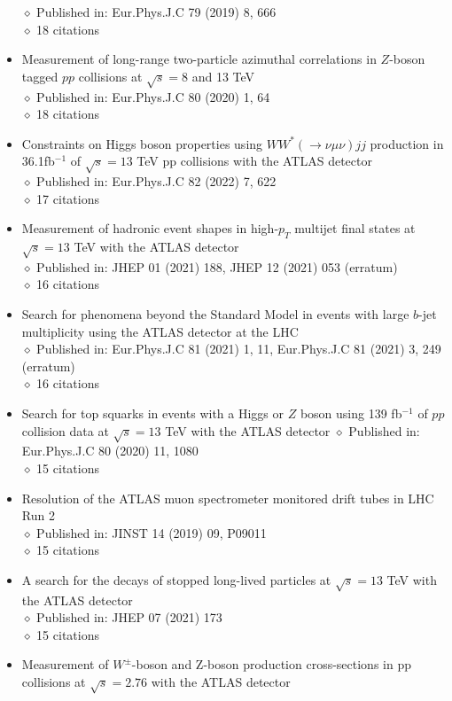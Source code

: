 \documentclass[margin, 10pt]{res} %
\begin{document}
\begin{resume}
\begin{itemize}
$\diamond$ Published in: Eur.Phys.J.C 79 (2019) 8, 666\\
$\diamond$ 18 citations
\item Measurement of long-range two-particle azimuthal correlations in $Z$-boson tagged $pp$ collisions at $\sqrt{s} = 8$ and 13 TeV\\
$\diamond$ Published in: Eur.Phys.J.C 80 (2020) 1, 64\\
$\diamond$ 18 citations
\item Constraints on Higgs boson properties using $WW^{*}(\rightarrow\nu\mu\nu)jj$ production in 36.1fb$^{-1}$ of $\sqrt{s} = 13$ TeV pp collisions with the ATLAS detector\\
$\diamond$ Published in: Eur.Phys.J.C 82 (2022) 7, 622\\
$\diamond$ 17 citations
\item Measurement of hadronic event shapes in high-$p_{T}$ multijet final states at $\sqrt{s} = 13$ TeV with the ATLAS detector\\
$\diamond$ Published in: JHEP 01 (2021) 188, JHEP 12 (2021) 053 (erratum)\\
$\diamond$ 16 citations
\item Search for phenomena beyond the Standard Model in events with large $b$-jet multiplicity using the ATLAS detector at the LHC\\
$\diamond$ Published in: Eur.Phys.J.C 81 (2021) 1, 11, Eur.Phys.J.C 81 (2021) 3, 249 (erratum)\\
$\diamond$ 16 citations
\item Search for top squarks in events with a Higgs or $Z$ boson using 139 fb$^{-1}$ of $pp$ collision data at $\sqrt{s} = 13$ TeV with the ATLAS detector
$\diamond$ Published in: Eur.Phys.J.C 80 (2020) 11, 1080\\
$\diamond$ 15 citations
\item Resolution of the ATLAS muon spectrometer monitored drift tubes in LHC Run 2\\
$\diamond$ Published in: JINST 14 (2019) 09, P09011\\
$\diamond$ 15 citations
\item A search for the decays of stopped long-lived particles at $\sqrt{s} = 13$ TeV with the ATLAS detector\\
$\diamond$ Published in: JHEP 07 (2021) 173\\
$\diamond$ 15 citations
\item Measurement of $W^{\pm}$-boson and Z-boson production cross-sections in pp collisions at $\sqrt{s} = 2.76$ with the ATLAS detector\\

\end{itemize}
\end{resume}
\end{document}
